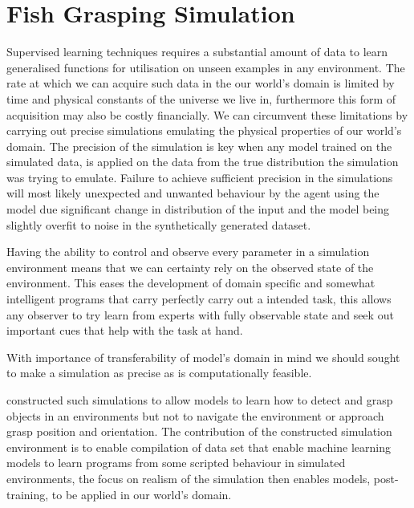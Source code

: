 \section{Fish Grasping Simulation}\label{sec:simulation}

Supervised learning techniques requires a substantial amount of data to learn generalised functions for utilisation on unseen examples in any environment. The rate at which we can acquire such data in the our world's domain is limited by time and physical constants of the universe we live in, furthermore this form of acquisition may also be costly financially. We can circumvent these limitations by carrying out precise simulations emulating the physical properties of our world's domain. The precision of the simulation is key when any model trained on the simulated data, is applied on the data from the true distribution %
the simulation was trying to emulate. 
Failure to achieve sufficient precision in the simulations will most likely unexpected and unwanted behaviour by the agent using the model due significant change in distribution of the input and the model being slightly overfit to noise in the synthetically generated dataset.

Having the ability to control and observe every parameter in a simulation environment means that we can certainty rely on the observed state of the environment. This eases the development of domain specific and somewhat intelligent programs that carry perfectly carry out a intended task, this allows any observer to try learn from experts with fully observable state and seek out important cues that help with the task at hand.   

With importance of transferability of model's domain in mind we should sought to make a simulation as precise as is computationally feasible.

\cite{Dyrstad2016} constructed such simulations to allow models to learn how to detect and grasp objects in an environments but not to navigate the environment or approach grasp position and orientation. The contribution of the constructed simulation environment is to enable compilation of data set that enable machine learning models to learn programs from some scripted behaviour in simulated environments, the focus on realism of the simulation then enables models, post-training, to be applied in our world's domain.


